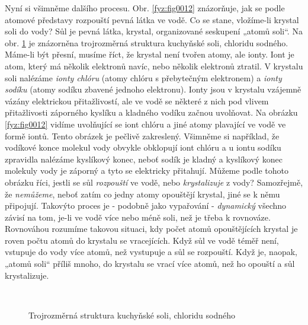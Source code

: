     Nyní si všimněme dalšího procesu. Obr. \ref{fyz:fig0012} znázorňuje, jak se podle atomové
    představy rozpouští pevná látka ve vodě. Co se stane, vložíme-li krystal soli do vody? Sůl je
    pevná látka, krystal, organizované seskupení „atomů soli“. Na obr. \ref{fyz:fig0013} je
    znázorněna trojrozměrná struktura kuchyňské soli, chloridu sodného. Máme-li být přesní, musíme
    říct, že krystal není tvořen atomy, ale ionty. Iont je atom, který má několik elektronů navíc,
    nebo několik elektronů ztratil. V krystalu soli nalézáme \emph{ionty chlóru} (atomy chlóru s
    přebytečným elektronem) a \emph{ionty sodíku} (atomy sodíku zbavené jednoho elektronu). Ionty
    jsou v krystalu vzájemně vázány elektrickou přitažlivostí, ale ve vodě se některé z nich pod
    vlivem přitažlivosti záporného kyslíku a kladného vodíku začnou uvolňovat. Na obrázku
    \ref{fyz:fig0012} vidíme uvolňující se iont chlóru a jiné atomy plavající ve vodě ve formě iontů.
    Tento obrázek je pečlivě zakreslený. Všimněme si například, že vodíkové konce molekul vody
    obvykle obklopují iont chlóru a u iontu sodíku zpravidla nalézáme kyslíkový konec, neboť sodík
    je kladný a kyslíkový konec molekuly vody je záporný a tyto se elektricky přitahují. Můžeme
    podle tohoto obrázku říci, jestli se sůl \emph{rozpouští} ve vodě, nebo \emph{krystalizuje} z
    vody? Samozřejmě, že \emph{nemůžeme}, neboť zatím co jedny atomy opouštějí krystal, jiné se k
    němu připojují. Takovýto proces je - podobně jako vypařování - \emph{dynamický} všechno závisí
    na tom, je-li ve vodě více nebo méně soli, než je třeba k rovnováze. Rovnováhou rozumíme takovou
    situaci, kdy počet atomů opouštějících krystal je roven počtu atomů do krystalu se vracejících.
    Když sůl ve vodě téměř není, vstupuje do vody více atomů, než vystupuje a sůl se rozpouští. Když
    je, naopak, „atomů soli“ příliš mnoho, do krystalu se vrací více atomů, než ho opouští a sůl
    krystalizuje.

    \begin{figure}[ht!]  %
      \centering
          {}                                                      \\                                   
          {}
      \caption{Trojrozměrná struktura kuchyňské soli, chloridu sodného\cite[s.~22]{Feynman01}}
      \label{fyz:fig0013}
    \end{figure}
    
